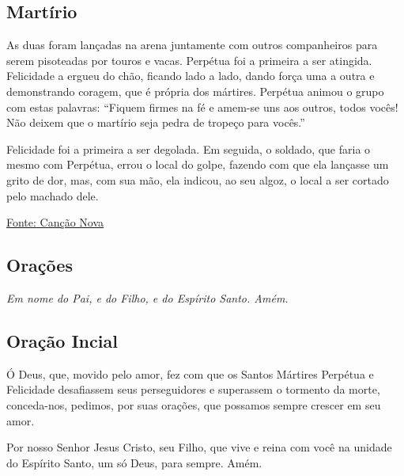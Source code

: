 \documentclass[18pt]{article}
\begin{document}
\begin{justify}
\vspace{0.7cm}

 \begin{justify}
 \subsection{Martírio}
 \end{justify}

As duas foram lançadas na arena juntamente com outros companheiros para serem pisoteadas por touros e vacas. Perpétua foi a primeira a ser atingida. Felicidade a ergueu do chão, ficando lado a lado, dando força uma a outra e demonstrando coragem, que é própria dos mártires. Perpétua animou o grupo com estas palavras: “Fiquem firmes na fé e amem-se uns aos outros, todos vocês! Não deixem que o martírio seja pedra de tropeço para vocês.”


Felicidade foi a primeira a ser degolada. Em seguida, o soldado, que faria o mesmo com Perpétua, errou o local do golpe, fazendo com que ela lançasse um grito de dor, mas, com sua mão, ela indicou, ao seu algoz, o local a ser cortado pelo machado dele.

\vfill

\begin{center}
 \href{https://santo.cancaonova.com/santo/santas-perpetua-e-felicidade/}{Fonte: Canção Nova}
\end{center}


\newpage
\begin{center}
 \section{Orações}\label{sec:Orações} %
\textit{Em nome do Pai, e do Filho, e do Espírito Santo. Amém.}
\end{center}

\subsection{Oração Incial}\label{sec:Oração_Inicial} %

Ó Deus, que, movido pelo amor, fez com que os Santos Mártires Perpétua e Felicidade desafiassem seus perseguidores e superassem o tormento da morte, conceda-nos, pedimos, por suas orações, que possamos sempre crescer em seu amor.

Por nosso Senhor Jesus Cristo, seu Filho, que vive e reina com você na unidade do Espírito Santo, um só Deus, para sempre. Amém.


\end{justify}
\end{document}
